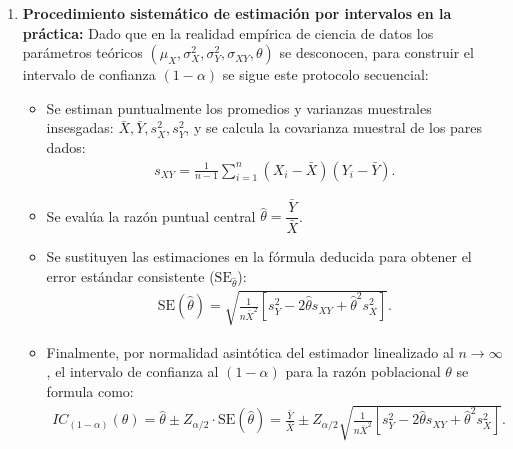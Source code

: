 \begin{solproblema}
\begin{enumerate}
		Por propiedades del muestreo independiente y apareado i.i.d. de tamaño $n$, las varianzas y covarianzas de los promedios muestrales son:
		\begin{align}
			\Var(\bar{X}) = \frac{\sigma_X^2}{n}, \quad \Var(\bar{Y}) = \frac{\sigma_Y^2}{n}, \quad \cov(\bar{X}, \bar{Y}) = \frac{\sigma_{XY}}{n}.
		\end{align}
		Sustituyendo estas varianzas muestrales en la ecuación y extrayendo el factor común $1 / (n \mu_X^2)$:
		\begin{align}
			\Var(\hat{\theta}) \approx \frac{\theta^2}{\mu_X^2} \left( \frac{\sigma_X^2}{n} \right) + \frac{1}{\mu_X^2} \left( \frac{\sigma_Y^2}{n} \right) - \frac{2\theta}{\mu_X^2} \left( \frac{\sigma_{XY}}{n} \right) = \frac{1}{n \mu_X^2} \left[ \sigma_Y^2 - 2\theta \sigma_{XY} + \theta^2 \sigma_X^2 \right].
		\end{align}
		Queda demostrado formalmente el resultado fundamental del Método Delta para cocientes algebraicos de promedios.
		
		\item \textbf{Procedimiento sistemático de estimación por intervalos en la práctica:}
		Dado que en la realidad empírica de ciencia de datos los parámetros teóricos $(\mu_X, \sigma_X^2, \sigma_Y^2, \sigma_{XY}, \theta)$ se desconocen, para construir el intervalo de confianza $(1-\alpha)$ se sigue este protocolo secuencial:
		\begin{itemize}
			\item Se estiman puntualmente los promedios y varianzas muestrales insesgadas: $\bar{X}, \bar{Y}, s_X^2, s_Y^2$, y se calcula la covarianza muestral de los pares dados:
			\begin{align}
				s_{XY} = \frac{1}{n-1} \sum_{i=1}^n (X_i - \bar{X})(Y_i - \bar{Y}).
			\end{align}
			\item Se evalúa la razón puntual central $\hat{\theta} = \dfrac{\bar{Y}}{\bar{X}}$.
			\item Se sustituyen las estimaciones en la fórmula deducida para obtener el error estándar consistente ($\text{SE}_{\hat{\theta}}$):
			\begin{align}
				\text{SE}(\hat{\theta}) = \sqrt{ \frac{1}{n \bar{X}^2} \left[ s_Y^2 - 2\hat{\theta} s_{XY} + \hat{\theta}^2 s_X^2 \right] }.
			\end{align}
			\item Finalmente, por normalidad asintótica del estimador linealizado al $n \to \infty$, el intervalo de confianza al $(1-\alpha)$ para la razón poblacional $\theta$ se formula como:
			\begin{align}
				IC_{(1-\alpha)}(\theta) = \hat{\theta} \pm Z_{\alpha/2} \cdot \text{SE}(\hat{\theta}) = \frac{\bar{Y}}{\bar{X}} \pm Z_{\alpha/2} \sqrt{ \frac{1}{n \bar{X}^2} \left[ s_Y^2 - 2\hat{\theta} s_{XY} + \hat{\theta}^2 s_X^2 \right] }.
			\end{align}
		\end{itemize}
	\end{enumerate}
\end{solproblema}
